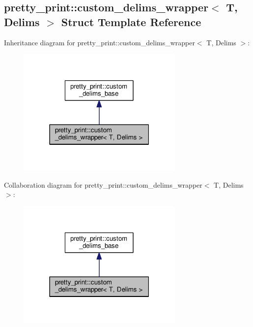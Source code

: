 \hypertarget{structpretty__print_1_1custom__delims__wrapper}{}\subsection{pretty\+\_\+print\+:\+:custom\+\_\+delims\+\_\+wrapper$<$ T, Delims $>$ Struct Template Reference}
\label{structpretty__print_1_1custom__delims__wrapper}


Inheritance diagram for pretty\+\_\+print\+:\+:custom\+\_\+delims\+\_\+wrapper$<$ T, Delims $>$\+:\nopagebreak
\begin{figure}[H]
\begin{center}
\leavevmode
\includegraphics[width=231pt]{structpretty__print_1_1custom__delims__wrapper__inherit__graph}
\end{center}
\end{figure}


Collaboration diagram for pretty\+\_\+print\+:\+:custom\+\_\+delims\+\_\+wrapper$<$ T, Delims $>$\+:\nopagebreak
\begin{figure}[H]
\begin{center}
\leavevmode
\includegraphics[width=231pt]{structpretty__print_1_1custom__delims__wrapper__coll__graph}
\end{center}
\end{figure}
